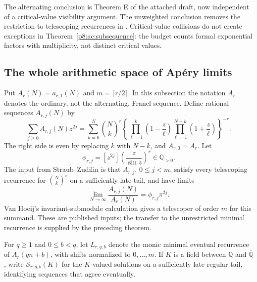 \documentclass[11pt,a4paper]{article}
\theoremstyle{definition}
\theoremstyle{remark}
\numberwithin{equation}{section}
\begin{document}
The alternating conclusion is Theorem E of the attached draft, now
independent of a critical-value visibility argument. The unweighted
conclusion removes the restriction to telescoping recurrences in
\cite[Theorem 1.1]{p8:AC_SZ}. Critical-value collisions do not create
exceptions in Theorem~\ref{p8:ac:subsequence}: the budget counts formal
exponential factors with multiplicity, not distinct critical values.

\subsection{The whole arithmetic space of Ap\'ery limits}

Put $A_r(N)=a_{r,1}(N)$ and $m=\lceil r/2\rceil$. In this
subsection the notation $A_r$ denotes the ordinary, not the alternating,
Franel sequence. Define rational sequences $A_{r,j}(N)$ by
\begin{equation}\label{p8:ac:deformation}
 \sum_{j\ge0}A_{r,j}(N)z^{2j}
 =\sum_{k=0}^N\binom Nk^r
 \left\{\prod_{\ell=1}^k\left(1-\frac z\ell\right)
        \prod_{\ell=1}^{N-k}\left(1+\frac z\ell\right)\right\}^{-r}.
\end{equation}
The right side is even by replacing $k$ with $N-k$, and
$A_{r,0}=A_r$. Let
\[
 \phi_{r,j}=[z^{2j}]\left(\frac z{\sin z}\right)^r
 \in\mathbb Q_{>0}.
\]
The input from Straub--Zudilin \cite[Theorem 1.3]{p8:AC_SZ} is that
$A_{r,j}$, $0\le j<m$, satisfy every telescoping recurrence for
$\binom Nk^r$ on a sufficiently late tail, and have limits
\begin{equation}\label{p8:ac:known-limits}
 \lim_{N\to\infty}\frac{A_{r,j}(N)}{A_r(N)}
             =\phi_{r,j}\pi^{2j}.
\end{equation}
Van Hoeij's invariant-submodule calculation
\cite[Remark 6]{p8:AC_vH} gives a telescoper of order $m$ for this
summand. These are published inputs; the transfer to the unrestricted
minimal recurrence is supplied by the preceding theorem.

For $q\ge1$ and $0\le b<q$, let $L_{r;q,b}$ denote the monic
minimal eventual recurrence of $A_r(qn+b)$, with shifts normalized
to $0,\ldots,m$. If $K$ is a field between $\mathbb Q$ and
$\overline{\mathbb Q}$, write $\mathcal S_{r;q,b}(K)$ for the
$K$-valued solutions on a sufficiently late regular tail, identifying
sequences that agree eventually.
\end{document}
